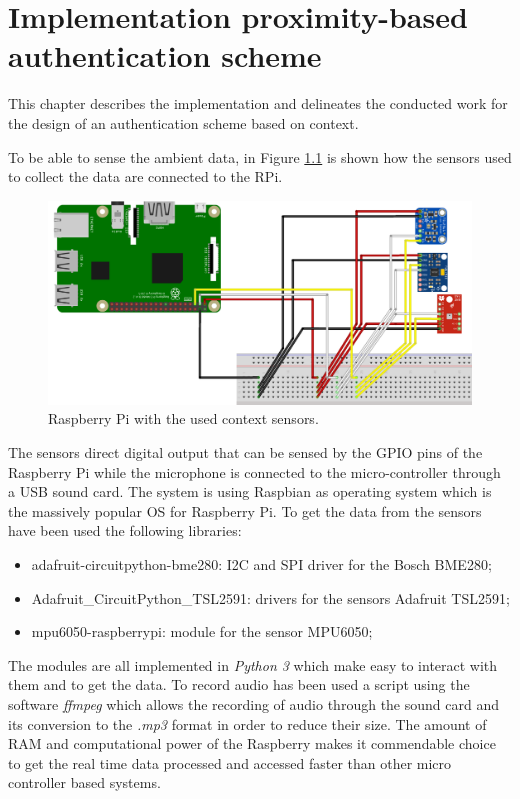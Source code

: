 \chapter{Implementation proximity-based authentication scheme}
\label{ch:implementationAuth}
This chapter describes the implementation and delineates the conducted work for the design of an authentication scheme based on context.

To be able to sense the ambient data, 
in Figure \ref{fig_device} is shown how the sensors used to collect the data are connected to the \acs{RPi}. 
\begin{figure}[!h]
\centering
\includegraphics[width=6in]{images/device.png}
\caption{Raspberry Pi with the used context sensors.}
\label{fig_device}
\end{figure}

The  sensors direct digital output that can be sensed by the GPIO pins of the Raspberry Pi while the microphone is connected to the micro-controller through a USB sound card.
The system is using Raspbian as operating system which  is  the  massively  popular  OS for Raspberry Pi.
To get the data from the sensors have been used the following libraries:
\begin{itemize}
    \item{adafruit-circuitpython-bme280:} I2C and SPI driver for the Bosch BME280;
    \item{Adafruit\_CircuitPython\_TSL2591:} drivers for the sensors Adafruit TSL2591;
    \item{mpu6050-raspberrypi:} module for the sensor MPU6050;
\end{itemize}
The modules are all implemented in \textit{Python 3} which make easy to interact with them and to get the data.
To record audio has been used a script using the software \textit{ffmpeg} which allows the recording of audio through the sound card and its conversion to the \textit{.mp3} format in order to reduce their size.
The amount of RAM and computational power of the Raspberry  makes it commendable choice to get the real time data processed and accessed faster than other micro controller based systems.

